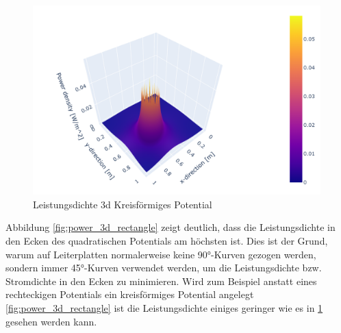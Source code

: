 \begin{figure}[h]
	\centering
	\includegraphics[width=0.99\textwidth]{papers/circuit/3d_circle.png}
	\caption{Leistungsdichte 3d Kreisförmiges Potential}
	\label{fig:power_3d_circle}
\end{figure}
Abbildung \ref{fig:power_3d_rectangle} zeigt deutlich, dass die Leistungsdichte in den Ecken des quadratischen Potentials am höchsten ist. Dies ist der Grund, warum auf Leiterplatten normalerweise keine 90°-Kurven gezogen werden, sondern immer 45°-Kurven verwendet werden, um die Leistungsdichte bzw. Stromdichte in den Ecken zu minimieren. Wird zum Beispiel anstatt eines rechteckigen Potentials ein kreisförmiges Potential angelegt \ref{fig:power_3d_rectangle} ist die Leistungsdichte einiges geringer wie es in \ref{fig:power_3d_circle} gesehen werden kann.

